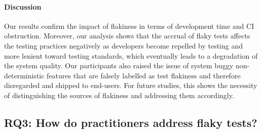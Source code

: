 \paragraph{\textbf{Discussion}}
Our results confirm the impact of flakiness in terms of development time and CI obstruction.
Moreover, our analysis shows that the accrual of flaky tests affects the testing practices negatively as developers become repelled by testing and more lenient toward testing standards, which eventually leads to a degradation of the system quality.
Our participants also raised the issue of system buggy non-deterministic features that are falsely labelled as test flakiness and therefore disregarded and shipped to end-users. For future studies, this shows the necessity of distinguishing the sources of flakiness and addressing them accordingly.
\subsection{\textsc{RQ3}: How do practitioners address flaky tests?}

